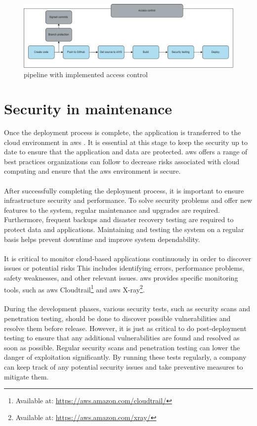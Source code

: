 \vspace{2mm}
\begin{figure}[H]
    \centering
    \includegraphics[width=0.8\columnwidth]{Images/accesscontrol.png}
    \caption{\gls{pipeline} with implemented access control}
    \label{fig: Pipeline with implemented access control}
\end{figure}

 
\section{Security in maintenance}
Once the deployment process is complete, the application is transferred to the cloud environment in \acrlong{aws} \cite{awsafterdep}. It is essential at this stage to keep the security up to date to ensure that the application and data are protected. \acrshort{aws} offers a range of best practices organizations can follow to decrease risks associated with cloud computing and ensure that the  \acrshort{aws} environment is secure.
\\~\\
After successfully completing the deployment process, it is important to ensure infrastructure security and performance. To solve security problems and offer new features to the system, regular maintenance and upgrades are required. Furthermore, frequent backups and disaster recovery testing are required to protect data and applications. Maintaining and testing the system on a regular basis helps prevent downtime and improve system dependability.
\\~\\
It is critical to monitor cloud-based applications continuously in order to discover issues or potential risks  This includes identifying errors, performance problems, safety weaknesses, and other relevant issues. \acrshort{aws} provides specific monitoring tools, such as \acrshort{aws} Cloudtrail\footnote{Available at: \url{https://aws.amazon.com/cloudtrail/}} and \acrshort{aws} X-ray\footnote{Available at: \url{https://aws.amazon.com/xray/}}. 
\\~\\
During the development phases, various security tests, such as security scans and penetration testing, should be done to discover possible vulnerabilities and resolve them before release. However, it is just as critical to do post-deployment testing to ensure that any additional vulnerabilities are found and resolved as soon as possible. Regular security scans and penetration testing can lower the danger of exploitation significantly. By running these tests regularly, a company can keep track of any potential security issues and take preventive measures to mitigate them. 

